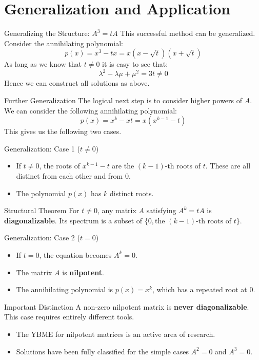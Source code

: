 \documentclass{beamer}
\begin{document}
\section{Generalization and Application}

\begin{frame}{Generalizing the Structure: $A^3 = tA$}
  This successful method can be generalized. Consider the annihilating polynomial:
  \[ p(x) = x^3 - tx = x(x - \sqrt{t})(x + \sqrt{t}) \]
  As long as we know that $t \neq 0$ it is easy to see that:
  \[ \lambda^2 - \lambda\mu + \mu^2 = 3t \neq 0 \]
  Hence we can construct all solutions as above.
\end{frame}

\begin{frame}{Further Generalization}
  The logical next step is to consider higher powers of $A$.
  We can consider the following annihilating polynomial:
  \[ p(x) = x^k - xt = x(x^{k - 1} - t) \]
  This gives us the following two cases.
\end{frame}

\begin{frame}{Generalization: Case 1 ($t \neq 0$)}
  \begin{itemize}
    \item If $t \neq 0$, the roots of $x^{k-1} - t$ are the $(k-1)$-th roots of $t$. These are all distinct from each other and from 0.
    \item The polynomial $p(x)$ has $k$ distinct roots.
  \end{itemize}
  \begin{block}{Structural Theorem}
    For $t \neq 0$, any matrix $A$ satisfying $A^k = tA$ is \textbf{diagonalizable}. Its spectrum is a subset of $\{0, \text{the } (k-1)\text{-th roots of } t\}$.
  \end{block}
\end{frame}

\begin{frame}{Generalization: Case 2 ($t = 0$)}
  \begin{itemize}
    \item If $t = 0$, the equation becomes $A^k = 0$.
    \item The matrix $A$ is \textbf{nilpotent}.
    \item The annihilating polynomial is $p(x) = x^k$, which has a repeated root at 0.
  \end{itemize}
  \begin{alertblock}{Important Distinction}
    A non-zero nilpotent matrix is \textbf{never diagonalizable}. This case requires entirely different tools.
  \end{alertblock}
    \vfill
  \begin{itemize}
    \item The YBME for nilpotent matrices is an active area of research.
    \item Solutions have been fully classified for the simple cases $A^2=0$ and $A^3=0$. \cite{nilpotent2, nilpotent3}
  \end{itemize}
\end{frame}
\end{document}
